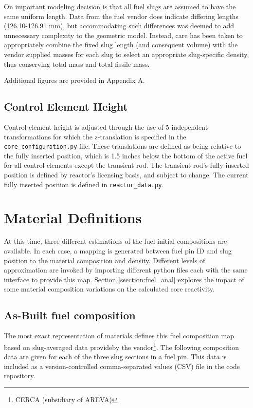 \documentclass{UWNR_modeling}
\begin{document}
On important modeling decision is that all fuel slugs are assumed to have the
same uniform length.  Data from the fuel vendor does indicate differing
lengths (126.10-126.91 mm), but accommodating such differences was deemed to add unnecessary
complexity to the geometric model.  Instead, care has been taken to
appropriately combine the fixed slug length (and consequent volume) with the
vendor supplied masses for each slug to select an appropriate slug-specific
density, thus conserving total mass and total fissile mass.

Additional figures are provided in Appendix A.

\subsection{Control Element Height}

Control element height is adjusted through the use of 5 independent
transformations for which the z-translation is specified in the
\texttt{core\_configuration.py} file.  These translations are defined as being
relative to the fully inserted position, which is 1.5 inches below the bottom
of the active fuel for all control elements except the transient rod.  The
transient rod's fully inserted position is defined by reactor's licensing
basis, and subject to change.  The current fully inserted position is defined
in \texttt{reactor\_data.py}.

\section{Material Definitions}\label{section:materials}

At this time, three different estimations of the fuel initial compositions are available.  In each case, a mapping is generated between fuel pin ID and slug position to the material composition and density.  Different levels of approximation are invoked by importing different python files each with the same interface to provide this map.  Section \ref{ssection:fuel_anal} explores the impact of some material composition variations on the calculated core reactivity.

\subsection{As-Built fuel composition}

The most exact representation of materials defines this fuel composition map based on slug-averaged data provideby the vendor\footnote{CERCA (subsidiary of AREVA)}. The following composition data are given for each of the three slug sections in a fuel pin.  This data is included as a version-controlled comma-separated values (CSV) file in the code repository.
\end{document}
